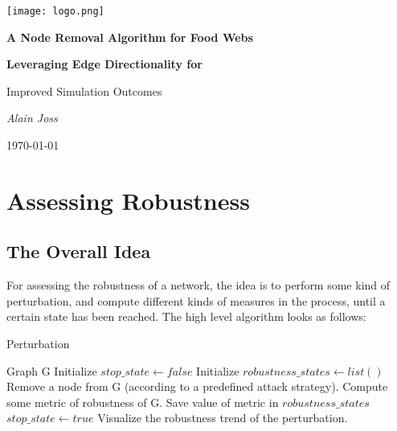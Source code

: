 \documentclass[a4paper, 12pt]{report}
\begin{document}

\begin{titlepage}
\centering
\texttt{[image: logo.png]}\par\vspace{1cm}
\vspace{1.25cm}
{\huge\bfseries A Node Removal Algorithm for Food Webs \par}
\vspace{0.5cm}
{\Large\bfseries Leveraging Edge Directionality for \par Improved Simulation Outcomes \par}
\vspace{4cm}
{\Large\itshape Alain Joss \par}
\vfill
{\large \today \par}
\end{titlepage}


\tableofcontents
\thispagestyle{empty}
\newpage


\chapter{Assessing Robustness}

\section{The Overall Idea}
For assessing the robustness of a network, 
the idea is to perform some kind of perturbation, 
and compute different kinds of measures in the process,
until a certain state has been reached.
The high level algorithm looks as follows:

\begin{algorithm}
    \caption{Perturbation}
    \begin{algorithmic}[1]
    \small
    \Require Graph G
    \State Initialize $stop\_state \gets false$
    \State Initialize $robustness\_states \gets list()$
        \State Remove a node from G (according to a predefined attack strategy).
        \State Compute some metric of robustness of G.
        \State Save value of metric in $robustness\_states$
            \State $stop\_state \gets true$
        \EndIf
    \EndWhile
    \State Visualize the robustness trend of the perturbation.
    \end{algorithmic}
\end{algorithm}
\end{document}
